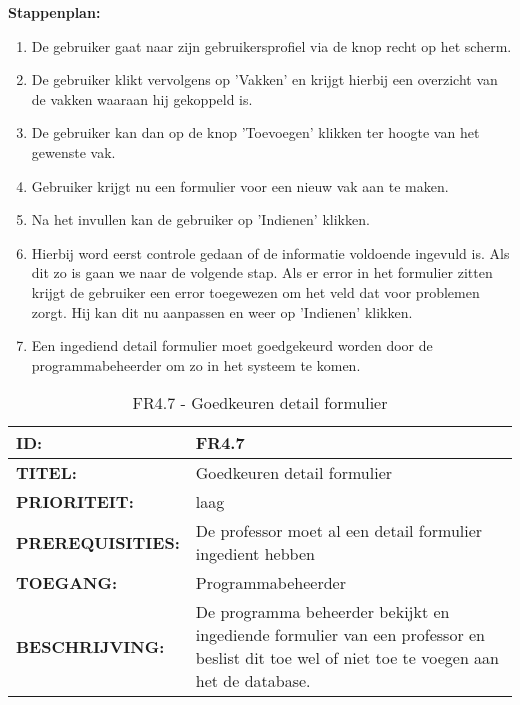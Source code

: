 \textbf{Stappenplan:}
	\begin{enumerate}
	\item De gebruiker gaat naar zijn gebruikersprofiel via de knop recht op het scherm.
	\item De gebruiker klikt vervolgens op 'Vakken' en krijgt hierbij een overzicht van de vakken waaraan hij gekoppeld is.
	\item De gebruiker kan dan op de knop 'Toevoegen' klikken ter hoogte van het gewenste vak.
	\item Gebruiker krijgt nu een formulier voor een nieuw vak aan te maken.
	\item Na het invullen kan de gebruiker op 'Indienen' klikken.
	\item Hierbij word eerst controle gedaan of de informatie voldoende ingevuld is. Als dit zo is gaan we naar de volgende stap. Als er error in het formulier zitten krijgt de gebruiker een error toegewezen om het veld dat voor problemen zorgt. Hij kan dit nu aanpassen en weer op 'Indienen' klikken.
	\item Een ingediend detail formulier moet goedgekeurd worden door de programmabeheerder om zo in het systeem te komen.
	\end{enumerate}

\noindent\begin{table}[H]
            \begin{tabular}{l | p{10cm}}
                \textbf{ID:} & FR4.7 \\ \hline
                \textbf{TITEL:} & Goedkeuren detail formulier   \\ \hline
                \textbf{PRIORITEIT:} &  laag \\ \hline
                \textbf{PREREQUISITIES:} & De professor moet al een detail formulier ingedient hebben\\ \hline
                \textbf{TOEGANG:} & Programmabeheerder \\ \hline
                \textbf{BESCHRIJVING:} & De programma beheerder bekijkt en ingediende formulier van een professor en beslist dit toe wel of niet toe te voegen aan het de database. 
            \end{tabular}\\
            \caption{FR4.7 - Goedkeuren detail formulier  }
            \label{tab:FR4.7 - Goedkeuren detail formulier  }
        \end{table}
 

